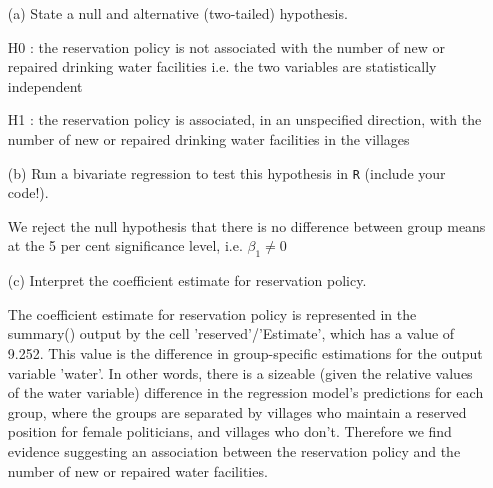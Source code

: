 \documentclass[12pt,letterpaper]{article}
\begin{document}
\begin{enumerate}
	\item [(a)] State a null and alternative (two-tailed) hypothesis. 
	\item [H0]: the reservation policy is not associated with the number of new or repaired drinking water facilities i.e. the two variables are statistically independent 
	
	\item [H1]: the reservation policy is associated, in an unspecified direction, with the number of new or repaired drinking water facilities in the villages
	
	\vspace{0.5cm}
	\item [(b)] Run a bivariate regression to test this hypothesis in \texttt{R} (include your code!).
	
	
	\item[] We reject the null hypothesis that there is no difference between group means at the 5 per cent significance level, i.e. $\beta_1 \neq 0$
	
	\vspace{0.5cm}
	\item [(c)] Interpret the coefficient estimate for reservation policy. 
	
	\item[] The coefficient estimate for reservation policy is represented in the summary() output by the cell 'reserved'/'Estimate', which has a value of 9.252. This value is the difference in group-specific estimations for the output variable 'water'. In other words, there is a sizeable (given the relative values of the water variable) difference in the regression model's predictions for each group, where the groups are separated by villages who maintain a reserved position for female politicians, and villages who don't. Therefore we find evidence suggesting an association between the reservation policy and the number of new or repaired water facilities. 
\end{enumerate}
\end{document}

